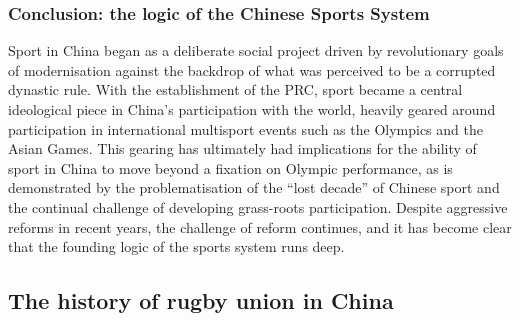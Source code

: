 \begin{CJK}{UTF8}{gbsn}
\subsubsection{Conclusion: the logic of the Chinese Sports System}

Sport in China began as a deliberate social project driven by revolutionary goals of modernisation against the backdrop of what was perceived to be a corrupted dynastic rule.  With the establishment of the PRC, sport became a central ideological piece in China's participation with the world, heavily geared around participation in international multisport events such as the Olympics and the Asian Games. This gearing has ultimately had implications for the ability of sport in China to move beyond a fixation on Olympic performance, as is demonstrated by the problematisation of the ``lost decade'' of Chinese sport and the continual challenge of developing grass-roots participation.  Despite aggressive reforms in recent years, the challenge of reform continues, and it has become clear that the founding logic of the sports system runs deep.










  \subsection{The history of rugby union in China}




\end{CJK}
